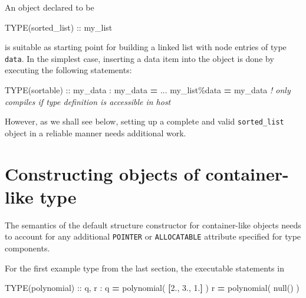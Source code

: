 \documentclass[]{scrartcl}
\newenvironment{Shaded}{}{}
\newcommand{\CommentTok}[1]{\textcolor[rgb]{0.38,0.63,0.69}{\textit{#1}}}
\newcommand{\DataTypeTok}[1]{\textcolor[rgb]{0.56,0.13,0.00}{#1}}
\newcommand{\FloatTok}[1]{\textcolor[rgb]{0.25,0.63,0.44}{#1}}
\newcommand{\KeywordTok}[1]{\textcolor[rgb]{0.00,0.44,0.13}{\textbf{#1}}}
\newcommand{\NormalTok}[1]{#1}
\newcommand{\OperatorTok}[1]{\textcolor[rgb]{0.40,0.40,0.40}{#1}}
\begin{document}
An object declared to be

\begin{Shaded}
\begin{Highlighting}[]
\DataTypeTok{TYPE(sorted\_list)} \DataTypeTok{::}\NormalTok{ my\_list}
\end{Highlighting}
\end{Shaded}

is suitable as starting point for building a linked list with node
entries of type \texttt{data}. In the simplest case, inserting a data
item into the object is done by executing the following statements:

\begin{Shaded}
\begin{Highlighting}[]
\DataTypeTok{TYPE(sortable)} \DataTypeTok{::}\NormalTok{ my\_data}
\NormalTok{:}
\NormalTok{my\_data }\KeywordTok{=}\NormalTok{ ...}
\NormalTok{my\_list}\OperatorTok{\%}\NormalTok{data }\KeywordTok{=}\NormalTok{ my\_data  }\CommentTok{! only compiles if type definition is accessible in host}
\end{Highlighting}
\end{Shaded}

However, as we shall see below, setting up a complete and valid
\texttt{sorted\_list} object in a reliable manner needs additional work.

\section{Constructing objects of container-like
type}\label{constructing-objects-of-container-like-type}

The semantics of the default structure constructor for container-like
objects needs to account for any additional \texttt{POINTER} or
\texttt{ALLOCATABLE} attribute specified for type components.

For the first example type from the last section, the executable
statements in

\begin{Shaded}
\begin{Highlighting}[]
\DataTypeTok{TYPE(polynomial)} \DataTypeTok{::}\NormalTok{ q, r}
\NormalTok{:}
\NormalTok{q }\KeywordTok{=}\NormalTok{ polynomial( }\KeywordTok{[}\FloatTok{2.}\NormalTok{, }\FloatTok{3.}\NormalTok{, }\FloatTok{1.}\KeywordTok{]}\NormalTok{ )}
\NormalTok{r }\KeywordTok{=}\NormalTok{ polynomial( null() )}
\end{Highlighting}
\end{Shaded}
\end{document}

